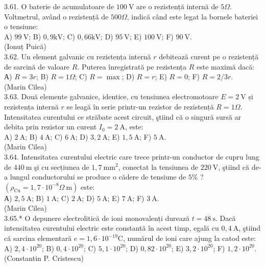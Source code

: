 \documentclass[10pt]{article}
\begin{document}
3.61. O baterie de acumulatoare de $100 \mathrm{~V}$ are o rezistență internă de $5 \Omega$. Voltmetrul, având o rezistență de $500 \Omega$, indică când este legat la bornele bateriei o tensiune:\\ A) $99 \mathrm{~V}$; B) $0,9 \mathrm{kV}$; C) $0,66 \mathrm{kV}$; D) $95 \mathrm{~V}$; E) $100 \mathrm{~V}$; F) $90 \mathrm{~V}$.\\ (Ionuț Puică)\\

3.62. Un element galvanic cu rezistența internă $r$ debitează curent pe o rezistență de sarcină de valoare $R$. Puterea înregistrată pe rezistența $R$ este maximă dacă:\\ А) $R=3 r$; B) $R=1 \Omega$; C) $R=\max$; D) $R=r$; E) $R=0$; F) $R=2 / 3 r$.\\ (Marin Cilea)\\

3.63. Două elemente galvanice, identice, cu tensiunea electromotoare $E=2 \mathrm{~V}$ și rezistența internă $r$ se leagă în serie printr-un rezistor de rezistență $R=1 \Omega$. Intensitatea curentului ce străbate acest circuit, ştiind că o singură sursă ar debita prin rezistor un curent $I_{0}=2 \mathrm{~A}$, este:\\ A) $2 \mathrm{~A}$; B) $4 \mathrm{~A}$; C) $6 \mathrm{~A}$; D) $3,2 \mathrm{~A}$; E) $1,5 \mathrm{~A}$; F) $5 \mathrm{~A}$.\\ (Marin Cilea)\\

3.64. Intensitatea curentului electric care trece printr-un conductor de cupru lung de $440 \mathrm{~m}$ şi cu secțiunea de $1,7 \mathrm{~mm}^{2}$, conectat la tensiunea de $220 \mathrm{~V}$, ştiind că de-a lungul conductorului se produce o cădere de tensiune de $5 \%$ ? $\left(\rho_{\mathrm{Cu}}=1,7 \cdot 10^{-8} \Omega \mathrm{~m}\right)$ este:\\ А) $2,5 \mathrm{~A}$; B) $1 \mathrm{~A}$; C) $2 \mathrm{~A}$; D) $5 \mathrm{~A}$; E) $7 \mathrm{~A}$; F) $3 \mathrm{~A}$.\\ (Marin Cilea)\\

3.65.* O depunere electrolitică de ioni monovalenți durează $t=48 \mathrm{~s}$. Dacă intensitatea curentului electric este constantă în acest timp, egală cu $0,4 \mathrm{~A}$, ştiind că sarcina elementară $e=1,6 \cdot 10^{-19} \mathrm{C}$, numărul de ioni care ajung la catod este:\\ A) $2,4 \cdot 10^{20}$; B) $0,4 \cdot 10^{20}$; C) $5,1 \cdot 10^{20}$; D) $0,82 \cdot 10^{20}$; E) $3,2 \cdot 10^{20}$; F) $1,2 \cdot 10^{20}$.\\ (Constantin P. Cristescu)\\
\end{document}
